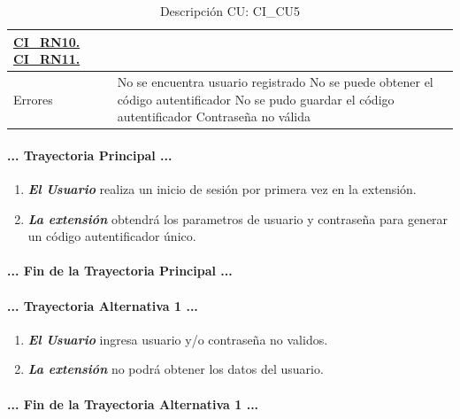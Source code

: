 \documentclass[12pt, a4paper, titlepage]{report}
\begin{document}
\begin{table}[H]
\begin{tabular}{ |p{3.5cm}||p{9.5cm}|}
    					\hyperref[CI_RN9]{\textbf{CI\_RN10.}} \newline
    					\hyperref[CI_RN10]{\textbf{CI\_RN11.}} \\
    					\hline
    					\cellcolor{azulclaro}Errores &
    					No se encuentra usuario registrado \newline 
    					No se puede obtener el código autentificador\newline
    					No se pudo guardar el código autentificador\newline
    					Contraseña no válida\\					
    					\hline
    				\end{tabular}
				\caption[DCU: CI\_CU5]{Descripción CU: CI\_CU5}
				\end{table}
				
				\paragraph{... Trayectoria Principal ...}
				\begin{enumerate}
					\item \textbf{\textit{El Usuario}} realiza un inicio de sesión por primera vez en la extensión.
					\item \textbf{\textit{La extensión}} obtendrá los parametros de usuario y contraseña para generar un código autentificador único.
				\end{enumerate}
				\paragraph{... Fin de la Trayectoria Principal ...}
				
				\paragraph{... Trayectoria Alternativa 1 ...}
				\begin{enumerate}
					\item \textbf{\textit{El Usuario}} ingresa usuario y/o contraseña no validos.
					\item \textbf{\textit{La extensión}} no podrá obtener los datos del usuario.
				\end{enumerate}
				\paragraph{... Fin de la Trayectoria Alternativa 1 ...}
				
				\newpage
				
\end{document}
